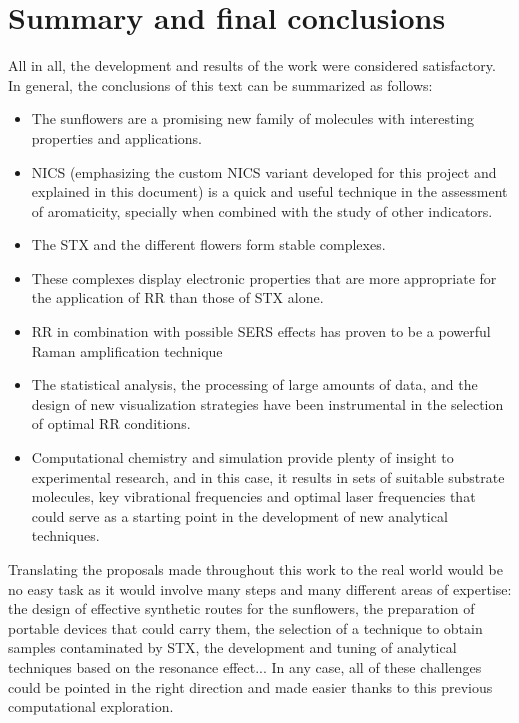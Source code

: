 \chapter{Summary and final conclusions}

All in all, the development and results of the work were considered satisfactory.
In general, the conclusions of this text can be summarized as follows:

\begin{itemize}
    \item The sunflowers are a promising new family of molecules with interesting properties and applications.
    \item NICS (emphasizing the custom NICS variant developed for this project and explained in this document) is a quick and useful technique in the assessment of aromaticity, specially when combined with the study of other indicators.
    \item The STX and the different flowers form stable complexes.
    \item These complexes display electronic properties that are more appropriate for the application of RR than those of STX alone.
    \item RR in combination with possible SERS effects has proven to be a powerful Raman amplification technique
    \item The statistical analysis, the processing of large amounts of data, and the design of new visualization strategies have been instrumental in the selection of optimal RR conditions.
    \item Computational chemistry and simulation provide plenty of insight to experimental research, and in this case, it results in sets of suitable substrate molecules, key vibrational frequencies and optimal laser frequencies that could serve as a starting point in the development of new analytical techniques.
\end{itemize}

Translating the proposals made throughout this work to the real world would be no easy task as it would involve many steps and many different areas of expertise: the design of effective synthetic routes for the sunflowers, the preparation of portable devices that could carry them, the selection of a technique to obtain samples contaminated by STX, the development and tuning of analytical techniques based on the resonance effect...
In any case, all of these challenges could be pointed in the right direction and made easier thanks to this previous computational exploration.

